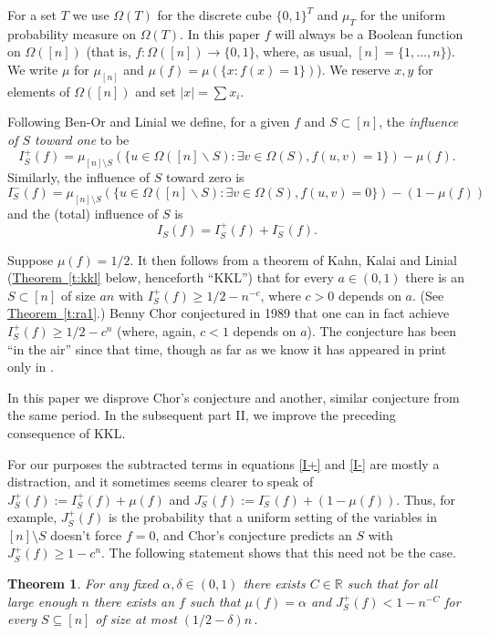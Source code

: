 \documentclass[11pt]{article}
\numberwithin{equation}{section}
\theoremstyle{definition}
\theoremstyle{plain}
\newcommand{\R}{\mathbb R}
\newcommand{\expref}[2]{\hyperref[#2]{#1~\ref{#2}}}
\newtheorem{thm}{Theorem}[section]
\newcommand{\beq}[1]{\begin{equation}\label{#1}}
\newcommand{\enq}[0]{\end{equation}}
\newcommand{\mn}[0]{\medskip\noindent}
\newcommand{\sub}[0]{\subseteq}
\newcommand{\sm}[0]{\setminus}
\renewcommand{\dots}[0]{,\ldots,}
\newcommand{\0}[0]{\emptyset}
\newcommand{\ga}[0]{\alpha }
\newcommand{\gd}[0]{\delta }
\newcommand{\gO}[0]{\Omega}
\begin{document}
\mn


For a set $T$ we use $\Omega(T)$ for the discrete cube
$\{0,1\}^T$ and $\mu_T$ for the uniform probability measure
on $\Omega (T)$.
In this paper
$f$ will always be a Boolean function on $\gO([n])$
(that is, $f:\gO([n]) \to \{0,1\}$, where, as usual,
$[n]=\{1\dots n\}$).
We write $\mu$ for $\mu_{[n]}$ and
$\mu(f)= \mu (\{ x:f(x)= 1 \})$).
We reserve $x,y$ for elements of $\Omega([n])$
and set $|x| = \sum x_i$.





Following Ben-Or and Linial \cite {bl} we define,
for a given $f$ and
$S \subset [n]$, the \emph{influence of $S$ toward one}
to be
\beq{I+}
I^+_S(f) = \mu_{[n]\sm S}( \{u \in \Omega ([n]\backslash S):
\exists v \in \Omega(S), f(u,v)=1\})- \mu(f) .
\enq
Similarly, the influence of $S$ toward zero is
\beq{I-}
I^-_S(f) = \mu_{[n]\sm S}( \{u \in \Omega ([n]\backslash S):
\exists v \in \Omega(S), f(u,v)=0\})- (1-\mu(f) )
\enq
and the (total) influence of $S$ is
$$I_S(f)=I_S^+(f)+I_S^-(f).$$


Suppose $\mu(f) =1/2$.
It then follows from a theorem of Kahn, Kalai and Linial
\cite{kkl}
(\expref{Theorem}{t:kkl} below, henceforth ``KKL'')
that for every $a\in (0,1) $ there is an $S \subset [n]$ of size
$an$ with
$I^+_S(f)\ge 1/2-n^{-c}$, where $c>0$ depends on $a$.
(See \expref{Theorem}{t:ra1}.)
Benny Chor conjectured in 1989 \cite {benny} that one can in fact
achieve
$I^+_S(f)\ge 1/2-c^n$ (where, again, $c<1$ depends on $a$).
The conjecture has been ``in the air'' since that time,
though as far as we know
it has appeared in print only in
\cite{k:nati,Nati}.

%
In this paper we disprove
Chor's conjecture and another, similar conjecture
from the same period. In the subsequent part II,
we improve the preceding consequence of KKL.

For our purposes the subtracted terms in
equations %
%
\eqref{I+} and
\eqref{I-} are mostly a distraction, and it sometimes seems
clearer to speak of $J^+_S(f):=I^+_S(f)+\mu(f) $
and $J^-_S(f):=I^-_S(f)+(1-\mu(f) )$.
Thus, for example, $J^+_S(f)$ is the probability that
a uniform setting of the variables in $[n]\sm S$
doesn't force $f=0$, and Chor's conjecture predicts
an $S$ with $J^+_S(f)\ge 1-c^n$.
The following statement shows that this need not be the case.

%
\begin{thm}\label{prop1}
For any fixed $\ga,\gd \in (0,1)$
%
there exists $C\in\R$ such that for
all   %
large enough $n$
%
there exists 
%
%
%
%
an    %
$f$ such that  
$\mu(f) =\ga$ and $J_S^+(f)<1-n^{-C}$
for every $S\sub [n]$ of size %
%
at most $(1/2-\gd)n\,.$ 
%
%
\end{thm}
\end{document}
